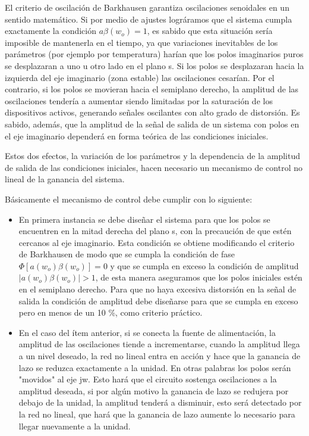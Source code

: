 \hspace{10pt} El criterio de oscilación de Barkhausen garantiza oscilaciones
senoidales en un sentido matemático. Si por medio de ajustes
lográramos que el sistema cumpla exactamente la condición
$a\beta(w_o)=1$, es sabido que esta situación sería imposible de
mantenerla en el tiempo, ya que variaciones inevitables de los
parámetros (por ejemplo por temperatura) harían que los polos
imaginarios puros se desplazaran a uno u otro lado en el plano s. Si
los polos se desplazaran hacia la izquierda del eje imaginario (zona
estable) las oscilaciones cesarían. Por el contrario, si los polos
se movieran hacia el semiplano derecho, la amplitud de las
oscilaciones tendería a aumentar siendo limitadas por la saturación
de los dispositivos activos, generando señales oscilantes con alto
grado de distorsión. Es sabido, además, que la amplitud de la señal
de salida de un sistema con polos en el eje imaginario dependerá en
forma teórica de las condiciones iniciales.

Estos dos efectos, la variación de los parámetros y la dependencia
de la amplitud de salida de las condiciones iniciales, hacen
necesario un mecanismo de control no lineal de la ganancia del
sistema.

Básicamente el mecanismo de control debe cumplir con lo siguiente:
\begin{itemize}
	\item En primera instancia se debe diseñar el sistema para que los polos
	se encuentren en la mitad derecha del plano s,  con la precaución de
	que estén cercanos al eje imaginario. Esta condición se obtiene
	modificando el criterio de Barkhausen de modo que se cumpla la
	condición de fase $\Phi[a(w_o)\beta(w_o)]= 0$ y que se cumpla en
	exceso la condición de amplitud $|a(w_o)\beta(w_o)|> 1$,  de esta
	manera aseguramos que los polos iniciales estén en el semiplano
	derecho. Para que no haya excesiva distorsión en la señal
	de salida la condición de amplitud debe diseñarse para que se cumpla
	en exceso pero en menos de un 10 \%, como criterio práctico.
	\item En el caso del ítem anterior, si se conecta la fuente de
	alimentación, la amplitud de las oscilaciones tiende a
	incrementarse, cuando la amplitud llega a un nivel deseado, la
	red no lineal entra en acción y hace que la ganancia de lazo se
	reduzca exactamente a la unidad. En otras palabras los polos
	serán "movidos" al eje jw. Esto hará que el circuito sostenga
	oscilaciones a la amplitud deseada, si por algún motivo la
	ganancia de lazo se redujera por debajo de la unidad, la
	amplitud tenderá a disminuir, esto será detectado por la red no
	lineal, que hará que la ganancia de lazo aumente lo necesario
	para llegar nuevamente a la unidad.
\end{itemize}

